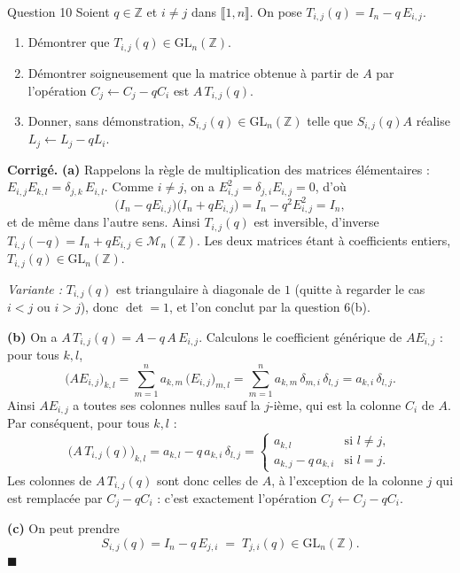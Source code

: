\documentclass[11pt,a4paper]{article}
\newenvironment{corrige}
  {\par\medskip\noindent
   \begin{tcolorbox}[blanker, breakable,
     borderline west={2.5pt}{0pt}{vertP},
     left=10pt, top=2pt, bottom=2pt]
   {\color{vertP}\bfseries Corrigé.}\hspace{0.5em}\ignorespaces}
  {\hfill$\blacksquare$\end{tcolorbox}\medskip}
\newcommand{\Z}{\mathbb{Z}}
\newcommand{\Mn}[1][n]{\mathcal{M}_{#1}}
\newcommand{\GLn}[1][n]{\mathrm{GL}_{#1}}
\newcommand{\ii}[2]{\llbracket #1,#2\rrbracket}
\begin{document}
\begin{enonce}{Question 10}
Soient $q\in\Z$ et $i\neq j$ dans $\ii{1}{n}$. On pose
$T_{i,j}(q)=I_n-q\,E_{i,j}$.
\begin{enumerate}
\item Démontrer que $T_{i,j}(q)\in\GLn(\Z)$.
\item Démontrer soigneusement que la matrice obtenue à partir de $A$
par l'opération $C_j\leftarrow C_j-qC_i$ est $A\,T_{i,j}(q)$.
\item Donner, sans démonstration, $S_{i,j}(q)\in\GLn(\Z)$ telle que
$S_{i,j}(q)A$ réalise $L_j\leftarrow L_j-qL_i$.
\end{enumerate}
\end{enonce}

\begin{corrige}
\textbf{(a)} Rappelons la règle de multiplication des matrices
élémentaires : $E_{i,j}E_{k,l}=\delta_{j,k}\,E_{i,l}$. Comme
$i\neq j$, on a $E_{i,j}^{2}=\delta_{j,i}E_{i,j}=0$, d'où
\[
\big(I_n-qE_{i,j}\big)\big(I_n+qE_{i,j}\big)
=I_n-q^{2}E_{i,j}^{2}=I_n ,
\]
et de même dans l'autre sens. Ainsi $T_{i,j}(q)$ est inversible,
d'inverse $T_{i,j}(-q)=I_n+qE_{i,j}\in\Mn(\Z)$. Les deux matrices
étant à coefficients entiers, $T_{i,j}(q)\in\GLn(\Z)$.

\emph{Variante :} $T_{i,j}(q)$ est triangulaire à diagonale de $1$
(quitte à regarder le cas $i<j$ ou $i>j$), donc $\det=1$, et l'on
conclut par la question 6(b).

\textbf{(b)} On a $A\,T_{i,j}(q)=A-q\,A\,E_{i,j}$. Calculons le
coefficient générique de $AE_{i,j}$ : pour tous $k,l$,
\[
\big(AE_{i,j}\big)_{k,l}
=\sum_{m=1}^{n}a_{k,m}\,\big(E_{i,j}\big)_{m,l}
=\sum_{m=1}^{n}a_{k,m}\,\delta_{m,i}\,\delta_{l,j}
=a_{k,i}\,\delta_{l,j} .
\]
Ainsi $AE_{i,j}$ a toutes ses colonnes nulles sauf la $j$-ième, qui
est la colonne $C_i$ de $A$. Par conséquent, pour tous $k,l$ :
\[
\big(A\,T_{i,j}(q)\big)_{k,l}
=a_{k,l}-q\,a_{k,i}\,\delta_{l,j}
=\begin{cases}
a_{k,l} & \text{si } l\neq j,\\[2pt]
a_{k,j}-q\,a_{k,i} & \text{si } l=j .
\end{cases}
\]
Les colonnes de $A\,T_{i,j}(q)$ sont donc celles de $A$, à
l'exception de la colonne $j$ qui est remplacée par $C_j-qC_i$ :
c'est exactement l'opération $C_j\leftarrow C_j-qC_i$.

\textbf{(c)} On peut prendre
\[
S_{i,j}(q)=I_n-q\,E_{j,i}\;=\;T_{j,i}(q)\in\GLn(\Z).
\]
\end{corrige}
\end{document}
